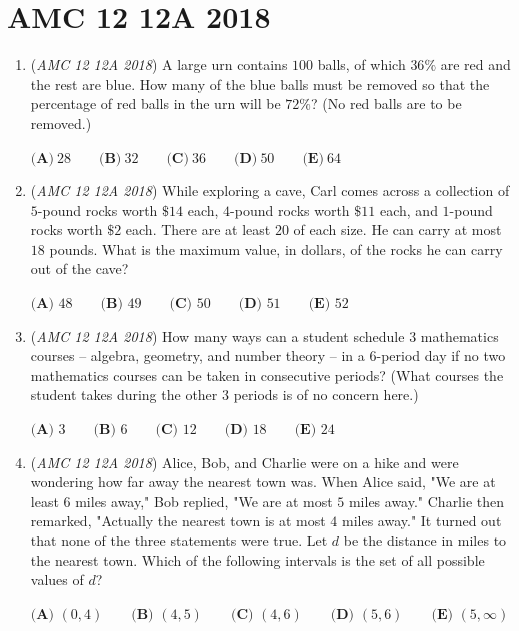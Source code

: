 \section{AMC 12 12A 2018}
        \begin{enumerate}
        	\item (\textit{AMC 12 12A 2018}) A large urn contains $100$ balls, of which $36 \%$ are red and the rest are blue. How many of the blue balls must be removed so that the percentage of red balls in the urn will be $72 \%$? (No red balls are to be removed.)


 $\textbf{(A)}\ 28 \qquad\textbf{(B)}\  32 \qquad\textbf{(C)}\  36 \qquad\textbf{(D)}\   50 \qquad\textbf{(E)}\ 64$


	\item (\textit{AMC 12 12A 2018}) While exploring a cave, Carl comes across a collection of $5$-pound rocks worth $\$14$ each, $4$-pound rocks worth $\$11$ each, and $1$-pound rocks worth $\$2$ each. There are at least $20$ of each size. He can carry at most $18$ pounds. What is the maximum value, in dollars, of the rocks he can carry out of the cave?


 $\textbf{(A) } 48 \qquad \textbf{(B) } 49 \qquad \textbf{(C) } 50 \qquad \textbf{(D) } 51 \qquad \textbf{(E) } 52$


	\item (\textit{AMC 12 12A 2018}) How many ways can a student schedule $3$ mathematics courses -- algebra, geometry, and number theory -- in a $6$-period day if no two mathematics courses can be taken in consecutive periods? (What courses the student takes during the other $3$ periods is of no concern here.)


 $\textbf{(A) }3\qquad\textbf{(B) }6\qquad\textbf{(C) }12\qquad\textbf{(D) }18\qquad\textbf{(E) }24$


	\item (\textit{AMC 12 12A 2018}) Alice, Bob, and Charlie were on a hike and were wondering how far away the nearest town was. When Alice said, "We are at least $6$ miles away," Bob replied, "We are at most $5$ miles away." Charlie then remarked, "Actually the nearest town is at most $4$ miles away." It turned out that none of the three statements were true. Let $d$ be the distance in miles to the nearest town. Which of the following intervals is the set of all possible values of $d$?


 $\textbf{(A) }   (0,4)   \qquad        \textbf{(B) }   (4,5)   \qquad    \textbf{(C) }   (4,6)   \qquad   \textbf{(D) }  (5,6)  \qquad  \textbf{(E) }   (5,\infty)$



\end{enumerate}
